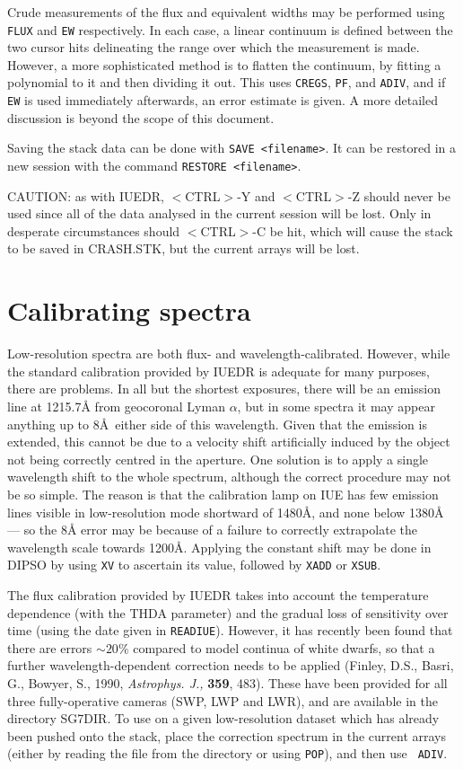 Crude measurements of the flux and equivalent widths may be performed using 
{\tt FLUX} and {\tt EW} respectively. In each case, a linear continuum is 
defined between the two cursor hits delineating the range over which the 
measurement is made. However, a more sophisticated method is to flatten 
the continuum, by fitting a polynomial to it and then dividing it out. 
This uses {\tt CREGS}, {\tt PF}, and {\tt ADIV}, and if {\tt EW} is used 
immediately afterwards, an error estimate is given. A more detailed discussion
is beyond the scope of this document. 

Saving the stack data can be done with {\tt SAVE <filename>}. It can be 
restored in a new session with the command {\tt RESTORE <filename>}. 

CAUTION: as with IUEDR, $<$CTRL$>$-Y and $<$CTRL$>$-Z should never be used
since all of the data analysed in the current session will be lost.
Only in desperate
circumstances should $<$CTRL$>$-C be hit, which will cause the stack to be 
saved in CRASH.STK, but the current arrays will be lost. 

\section{Calibrating spectra}

Low-resolution spectra are both flux- and wavelength-calibrated. However, while 
the standard calibration provided by IUEDR is adequate for many purposes, 
there are problems. In all but the shortest exposures, there will be an 
emission line at 1215.7{\AA} from geocoronal Lyman $\alpha$, but in some 
spectra it may appear anything up to 8\AA\ either side of this wavelength. 
Given that the emission is extended, this cannot be due to a velocity shift
artificially induced by the object not being correctly centred in the aperture. 
One solution is to apply a single wavelength shift to the whole spectrum, 
although the correct procedure may not be so simple. The reason is that the 
calibration lamp on IUE has few emission lines visible in low-resolution mode
shortward of 1480{\AA}, and none below 1380{\AA} --- so the 8{\AA} error may be 
because of a failure to correctly extrapolate the wavelength scale towards
1200{\AA}. Applying the constant shift may be done in DIPSO by using
{\tt XV} to ascertain its value, followed by {\tt XADD} or {\tt XSUB}. 

The flux calibration provided by IUEDR takes into account the temperature
dependence (with the THDA parameter) and the gradual loss of sensitivity 
over time (using the date given in {\tt READIUE}). However, it has recently
been found that there are errors $\sim 20$\% compared to model continua of
white dwarfs, so that a further wavelength-dependent correction needs to be 
applied (Finley, D.S., Basri, G., Bowyer, S., 1990, {\it Astrophys. J.,} 
{\bf 359}, 483). These have been provided for all three fully-operative 
cameras (SWP, LWP and LWR), and are available in the directory SG7DIR. 
To use on a given low-resolution dataset which has already been pushed onto 
the stack, place the correction spectrum in the current arrays (either by 
reading the file from the directory or using {\tt POP}), and then use {\tt
ADIV}. 

